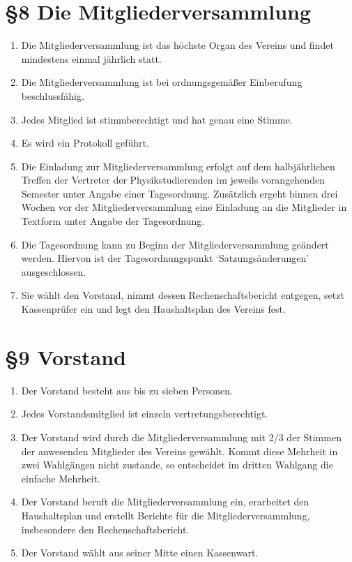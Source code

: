 \documentclass[ngerman]{article}
\begin{document}
\section*{§8 Die Mitgliederversammlung}
\begin{enumerate}
 \item Die Mitgliederversammlung ist das höchste Organ des Vereins und findet mindestens einmal jährlich statt.
 \item Die Mitgliederversammlung ist bei ordnungsgemäßer Einberufung beschlussfähig.
 \item Jedes Mitglied ist stimmberechtigt und hat genau eine Stimme.
 \item Es wird ein Protokoll geführt.
 \item Die Einladung zur Mitgliederversammlung erfolgt auf dem halbjährlichen Treffen der Vertreter der Physikstudierenden im jeweils vorangehenden Semester unter Angabe einer Tagesordnung. Zusätzlich ergeht binnen drei Wochen vor der Mitgliederversammlung eine Einladung an die Mitglieder in Textform unter Angabe der Tagesordnung.
 \item Die Tagesordnung kann zu Beginn der Mitgliederversammlung geändert werden. Hiervon ist der Tagesordnungspunkt `Satzungsänderungen' ausgeschlossen.
 \item Sie wählt den Vorstand, nimmt dessen Rechenschaftsbericht entgegen, setzt Kassenprüfer ein und legt den Haushaltsplan des Vereins fest.
\end{enumerate}


\section*{§9 Vorstand}
\begin{enumerate}
 \item Der Vorstand besteht aus bis zu sieben Personen.
 \item Jedes Vorstandsmitglied ist einzeln vertretungsberechtigt.
 \item Der Vorstand wird durch die Mitgliederversammlung mit 2/3 der Stimmen der anwesenden Mitglieder des Vereins gewählt. Kommt diese Mehrheit in zwei Wahlgängen nicht zustande, so entscheidet im dritten Wahlgang die einfache Mehrheit.
 \item Der Vorstand beruft die Mitgliederversammlung ein, erarbeitet den Haushaltsplan und erstellt Berichte für die Mitgliederversammlung, insbesondere den Rechenschaftsbericht.
 \item Der Vorstand wählt aus seiner Mitte einen Kassenwart.
\end{enumerate}
\end{document}

